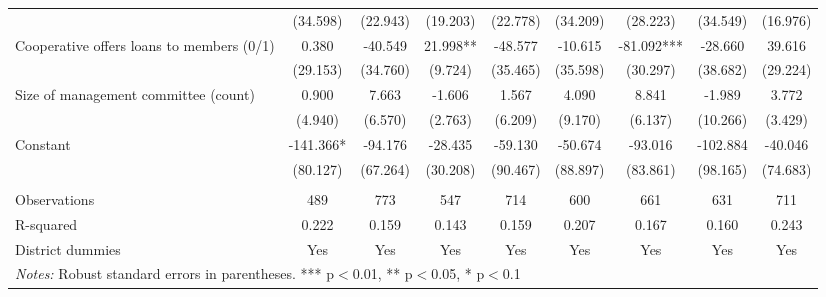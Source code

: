 \documentclass[11pt]{article}
\begin{document}
\begin{landscape}
\begin{table}[H]
{\begin{tabularx}{1.8\linewidth}{lcccccccc}
 & (34.598) & (22.943) & (19.203) & (22.778) & (34.209) & (28.223) & (34.549) & (16.976) \\
Cooperative offers loans to members (0/1) & 0.380 & -40.549 & 21.998** & -48.577 & -10.615 & -81.092*** & -28.660 & 39.616 \\
 & (29.153) & (34.760) & (9.724) & (35.465) & (35.598) & (30.297) & (38.682) & (29.224) \\
Size of management committee (count) & 0.900 & 7.663 & -1.606 & 1.567 & 4.090 & 8.841 & -1.989 & 3.772 \\
 & (4.940) & (6.570) & (2.763) & (6.209) & (9.170) & (6.137) & (10.266) & (3.429) \\
Constant & -141.366* & -94.176 & -28.435 & -59.130 & -50.674 & -93.016 & -102.884 & -40.046 \\
 & (80.127) & (67.264) & (30.208) & (90.467) & (88.897) & (83.861) & (98.165) & (74.683) \\
 &  &  &  &  &  &  &  &  \\
Observations & 489 & 773 & 547 & 714 & 600 & 661 & 631 & 711 \\
R-squared & 0.222 & 0.159 & 0.143 & 0.159 & 0.207 & 0.167 & 0.160 & 0.243 \\
 District dummies & Yes & Yes & Yes & Yes & Yes & Yes & Yes & Yes \\ \hline
\multicolumn{9}{l}{\textit{Notes:} Robust standard errors in parentheses. *** p$<$0.01, ** p$<$0.05, * p$<$0.1} \\
  \end{tabularx}}
\end{table}
\doublespacing

\end{landscape}

\newpage

\end{document}
